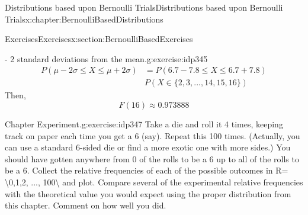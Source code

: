 \documentclass[oneside,10pt,]{book}
\numberwithin{equation}{section}
\begin{document}
\begin{chapterptx}{Distributions based upon Bernoulli Trials}{}{Distributions based upon Bernoulli Trials}{}{}{x:chapter:BernoulliBasedDistributions}
\begin{sectionptx}{Exercises}{}{Exercises}{}{}{x:section:BernoulliBasedExercises}
\begin{inlineexercise}{- 2 standard deviations from the mean.}{g:exercise:idp345}
\begin{align*}
P(\mu - 2\sigma \le X \le \mu + 2\sigma) & = P(6.7 - 7.8 \le X \le 6.7 + 7.8)\\
& P( X \in \{2, 3, ... , 14, 15, 16 \} )
\end{align*}
Then,%
\begin{equation*}
F(16) \approx 0.973888
\end{equation*}
%
\end{inlineexercise}%
\begin{inlineexercise}{Chapter Experiment.}{g:exercise:idp347}%
Take a die and roll it 4 times, keeping track on paper each time you get a 6 (say).  Repeat this 100 times. (Actually, you can use a standard 6-sided die or find a more exotic one with more sides.)  You should have gotten anywhere from 0 of the rolls to be a 6 up to all of the rolls to be a 6.  Collect the relative frequencies of each of the possible outcomes in R= \textbackslash{}\textbraceleft{}0,1,2, ..., 100\textbackslash{}\textbraceright{} and plot.  Compare several of the experimental relative frequencies with the theoretical value you would expect using the proper distribution from this chapter. Comment on how well you did.%
\end{inlineexercise}%
\end{sectionptx}
\end{chapterptx}
%
%
\typeout{************************************************}
\typeout{************************************************}
%
\end{document}

